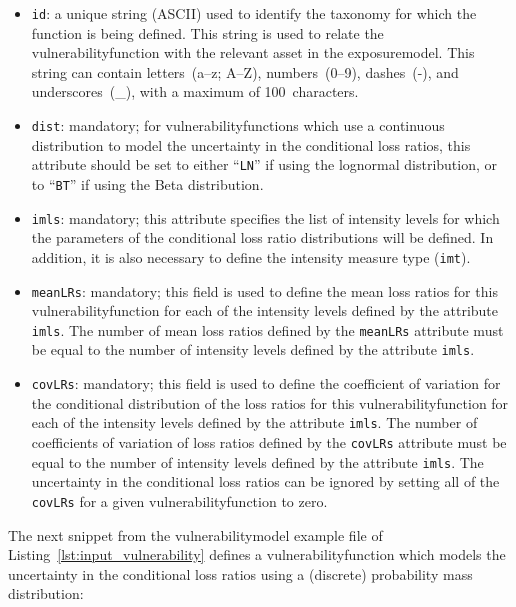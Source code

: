 \begin{itemize}

  \item \Verb+id+: a unique string (ASCII) used to identify the \gls{taxonomy} for 
    which the function is being defined. This string is used to relate the 
    \gls{vulnerabilityfunction} with the relevant \gls{asset} in the 
    \gls{exposuremodel}. This string can contain letters~(a--z; A--Z), 
    numbers~(0--9), dashes~(-), and underscores~(\_), with a maximum of
    100~characters.

  \item \Verb+dist+: mandatory; for \glspl{vulnerabilityfunction} which use a continuous 
    distribution to model the uncertainty in the conditional loss ratios, 
    this attribute should be set to either ``\Verb+LN+'' if using the lognormal
    distribution, or to ``\Verb+BT+'' if using the Beta distribution.

  \item \Verb+imls+: mandatory; this attribute specifies the list of intensity levels
    for which the parameters of the conditional loss ratio distributions will
    be defined. In addition, it is also necessary to define the intensity 
    measure type (\Verb+imt+).

  \item \Verb+meanLRs+: mandatory; this field is used to define the mean loss ratios
    for this \gls{vulnerabilityfunction} for each of the intensity levels
    defined by the attribute \Verb+imls+. The number of mean loss ratios
    defined by the \Verb+meanLRs+ attribute must be equal to the number of
    intensity levels defined by the attribute \Verb+imls+.

  \item \Verb+covLRs+: mandatory; this field is used to define the coefficient of 
    variation for the conditional distribution of the loss ratios for this
    \gls{vulnerabilityfunction} for each of the intensity levels defined by
    the attribute \Verb+imls+. The number of coefficients of variation of loss
    ratios defined by the \Verb+covLRs+ attribute must be equal to the number
    of intensity levels defined by the attribute \Verb+imls+. The uncertainty
    in the conditional loss ratios can be ignored by setting all of the
    \Verb+covLRs+ for a given \gls{vulnerabilityfunction} to zero.

\end{itemize}


The next snippet from the \gls{vulnerabilitymodel} example file of
Listing~\ref{lst:input_vulnerability} defines a \gls{vulnerabilityfunction}
which models the uncertainty in the conditional loss ratios using a
(discrete) probability mass distribution:

